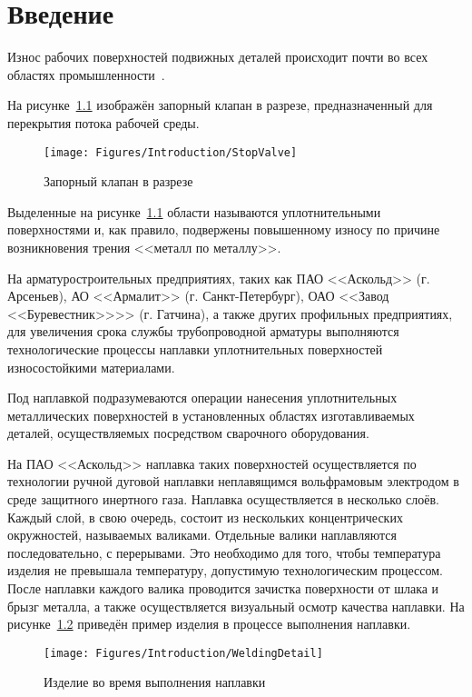 \chapter{Введение}
Износ рабочих поверхностей подвижных деталей происходит почти во всех областях промышленности~\cite{Oo_2018}.

На рисунке~\ref{fig:Introduction:StopValve} изображён запорный клапан в разрезе, предназначенный для перекрытия потока рабочей среды.

\begin{figure}[H]
    \centering
    \vspace{14pt}
    \texttt{[image: Figures/Introduction/StopValve]}
    \caption{Запорный клапан в разрезе}
    \label{fig:Introduction:StopValve}
\end{figure}

Выделенные на рисунке~\ref{fig:Introduction:StopValve} области называются уплотнительными поверхностями и, как правило, подвержены повышенному износу по причине возникновения трения <<металл по металлу>>.

На арматуростроительных предприятиях, таких как ПАО <<Аскольд>> (г. Арсеньев), АО <<Армалит>> (г. Санкт-Петербург), ОАО <<Завод <<Буревестник>>>> (г. Гатчина), а также других профильных предприятиях, для увеличения срока службы трубопроводной арматуры выполняются технологические процессы наплавки уплотнительных поверхностей износостойкими материалами.

Под наплавкой подразумеваются операции нанесения уплотнительных металлических поверхностей в установленных областях изготавливаемых деталей, осуществляемых посредством сварочного оборудования.

На ПАО <<Аскольд>> наплавка таких поверхностей осуществляется по технологии ручной дуговой наплавки неплавящимся вольфрамовым электродом в среде защитного инертного газа.
Наплавка осуществляется в несколько слоёв.
Каждый слой, в свою очередь, состоит из нескольких концентрических окружностей, называемых валиками.
Отдельные валики наплавляются последовательно, с перерывами.
Это необходимо для того, чтобы температура изделия не превышала температуру, допустимую технологическим процессом.
После наплавки каждого валика проводится зачистка поверхности от шлака и брызг металла, а также осуществляется визуальный осмотр качества наплавки.
На рисунке~\ref{fig:Introduction:WeldingDetail} приведён пример изделия в процессе выполнения наплавки.

\begin{figure}[H]
    \centering
    \vspace{14pt}
    \texttt{[image: Figures/Introduction/WeldingDetail]}
    \caption{Изделие во время выполнения наплавки}
    \label{fig:Introduction:WeldingDetail}
\end{figure}

